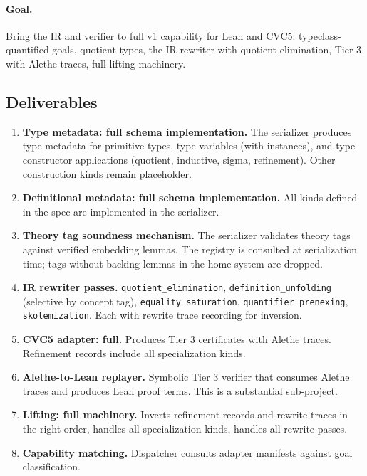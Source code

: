 \documentclass[11pt,letterpaper]{article}
\begin{document}
\paragraph{Goal.} Bring the IR and verifier to full v1 capability for
Lean and CVC5: typeclass-quantified goals, quotient types, the IR
rewriter with quotient elimination, Tier 3 with Alethe traces, full
lifting machinery.

\subsection{Deliverables}

\begin{enumerate}
  \item \textbf{Type metadata: full schema implementation.} The
        serializer produces type metadata for primitive types, type
        variables (with instances), and type constructor applications
        (quotient, inductive, sigma, refinement). Other construction
        kinds remain placeholder.
  \item \textbf{Definitional metadata: full schema implementation.} All
        kinds defined in the spec are implemented in the serializer.
  \item \textbf{Theory tag soundness mechanism.} The serializer
        validates theory tags against verified embedding lemmas. The
        registry is consulted at serialization time; tags without
        backing lemmas in the home system are dropped.
  \item \textbf{IR rewriter passes.} \texttt{quotient\_elimination},
        \texttt{definition\_unfolding} (selective by concept tag),
        \texttt{equality\_saturation}, \texttt{quantifier\_prenexing},
        \texttt{skolemization}. Each with rewrite trace recording for
        inversion.
  \item \textbf{CVC5 adapter: full.} Produces Tier 3 certificates with
        Alethe traces. Refinement records include all specialization
        kinds.
  \item \textbf{Alethe-to-Lean replayer.} Symbolic Tier 3 verifier
        that consumes Alethe traces and produces Lean proof terms.
        This is a substantial sub-project.
  \item \textbf{Lifting: full machinery.} Inverts refinement records
        and rewrite traces in the right order, handles all
        specialization kinds, handles all rewrite passes.
  \item \textbf{Capability matching.} Dispatcher consults adapter
        manifests against goal classification.
\end{enumerate}
\end{document}
